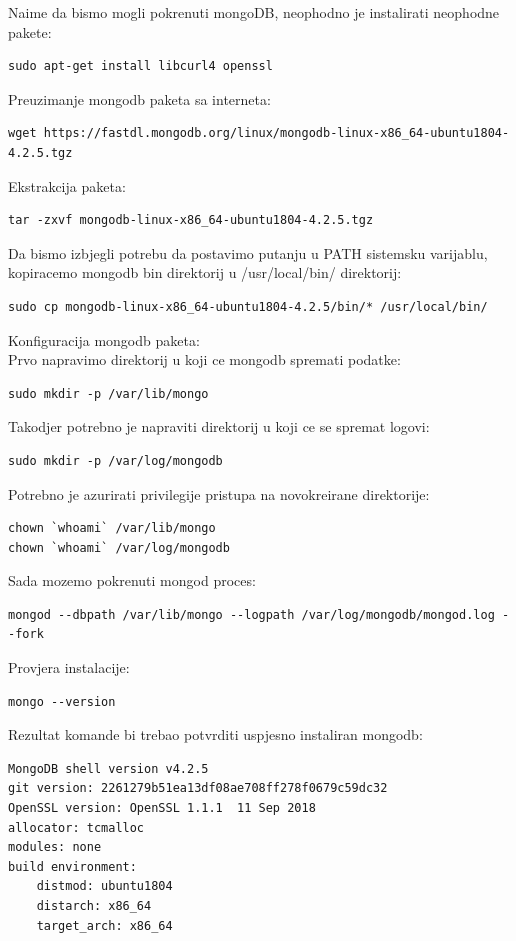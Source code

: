 \documentclass[12pt,vi]{mitthesis}
\begin{document}
\noindent
Naime da bismo mogli pokrenuti mongoDB, neophodno je instalirati neophodne pakete:
\begin{lstlisting}[style=BashInputStyle]
sudo apt-get install libcurl4 openssl
\end{lstlisting}
Preuzimanje mongodb paketa sa interneta:
\begin{lstlisting}[style=BashInputStyle]
wget https://fastdl.mongodb.org/linux/mongodb-linux-x86_64-ubuntu1804-4.2.5.tgz
\end{lstlisting}
Ekstrakcija paketa:
\begin{lstlisting}[style=BashInputStyle]
tar -zxvf mongodb-linux-x86_64-ubuntu1804-4.2.5.tgz
\end{lstlisting}
Da bismo izbjegli potrebu da postavimo putanju u PATH sistemsku varijablu, kopiracemo mongodb bin direktorij u /usr/local/bin/ direktorij:
\begin{lstlisting}[style=BashInputStyle]
sudo cp mongodb-linux-x86_64-ubuntu1804-4.2.5/bin/* /usr/local/bin/
\end{lstlisting}
Konfiguracija mongodb paketa:\\
Prvo napravimo direktorij u koji ce mongodb spremati podatke:
\begin{lstlisting}[style=BashInputStyle]
sudo mkdir -p /var/lib/mongo
\end{lstlisting}
Takodjer potrebno je napraviti direktorij u koji ce se spremat logovi:
\begin{lstlisting}[style=BashInputStyle]
sudo mkdir -p /var/log/mongodb
\end{lstlisting}
Potrebno je azurirati privilegije pristupa na novokreirane direktorije:
\begin{lstlisting}[style=BashInputStyle]
chown `whoami` /var/lib/mongo 
chown `whoami` /var/log/mongodb
\end{lstlisting}
Sada mozemo pokrenuti mongod proces:
\begin{lstlisting}[style=BashInputStyle]
mongod --dbpath /var/lib/mongo --logpath /var/log/mongodb/mongod.log --fork
\end{lstlisting}
Provjera instalacije:
\begin{lstlisting}[style=BashInputStyle]
mongo --version
\end{lstlisting}
Rezultat komande bi trebao potvrditi uspjesno instaliran mongodb:
\begin{lstlisting}[style=BashInputStyle]
MongoDB shell version v4.2.5
git version: 2261279b51ea13df08ae708ff278f0679c59dc32
OpenSSL version: OpenSSL 1.1.1  11 Sep 2018
allocator: tcmalloc
modules: none
build environment:
    distmod: ubuntu1804
    distarch: x86_64
    target_arch: x86_64
\end{lstlisting}
\end{document}
